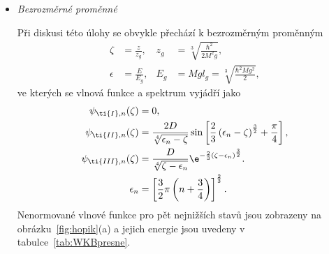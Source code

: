 \begin{solution}
\begin{enumerate}
\begin{itemize}
                    Finální vlnové funkce mají tvar
                    \begin{align}
                        \psi_{\ti{I},n}(z)
                            &=0,\nonumber\\
                        \label{eq:WKB}
                        \psi_{\ti{II},n}(z)
                            &=\frac{2C}{\sqrt[4]{2M\left(E_{n}-mgz\right)}}
                            \sin\left[\frac{2}{3\hbar g}\sqrt{\frac{2}{M}}\left(E_{n}-Mgz\right)^{\frac{3}{2}}+\frac{\pi}{4}\right],\\
                        \psi_{\ti{III},n}(z)
                            &=\frac{C}{\sqrt[4]{2M\left(mgz-E_{n}\right)}}
                            \e^{-\frac{2}{3\hbar g}\sqrt\frac{2}{M}\left(Mgz-E_{n}\right)^{\frac{3}{2}}},\nonumber
                    \end{align}
                    kde za $E_{n}$ se dosadí z kvantovací podmínky~\eqref{eq:podminka0} a parametr $C$ je zafixován normalizací.

                \item\emph{Bezrozměrné proměnné}  
                
                    Při diskusi této úlohy se obvykle přechází k bezrozměrným proměnným
                    \begin{align}
                        \zeta&=\frac{z}{z_{g}},
                        &z_{g}&=\sqrt[3]{\frac{\hbar^{2}}{2M^{2}g}},\nonumber\\
                        \label{eq:Units}
                        \epsilon&=\frac{E}{E_{g}},
                        &E_{g}&=Mgl_{g}=\sqrt[3]{\frac{\hbar^{2}Mg^{2}}{2}},
                    \end{align}
                    ve kterých se vlnová funkce a spektrum vyjádří jako
                    \begin{align}
                        \psi_{\ti{I},n}(\zeta)
                            &=0,\nonumber\\
                        \psi_{\ti{II},n}(\zeta)
                            &=\frac{2D}{\sqrt[4]{\epsilon_{n}-\zeta}}\sin\left[\frac{2}{3}\left(\epsilon_{n}-\zeta\right)^{\frac{3}{2}}+\frac{\pi}{4}\right],\nonumber\\
                        \psi_{\ti{III},n}(\zeta)
                            &=\frac{D}{\sqrt[4]{\zeta-\epsilon_{n}}}\e^{-\frac{2}{3}\left(\zeta-\epsilon_{n}\right)^{\frac{3}{2}}}.\nonumber\\
                        \label{eq:WKBResult}
                        \epsilon_{n}
                            &=\left[\frac{3}{2}\pi\left(n+\frac{3}{4}\right)\right]^{\frac{2}{3}}.
                        \end{align}
                    Nenormované vlnové funkce pro pět nejnižších stavů jsou zobrazeny na obrázku~\ref{fig:hopik}(a) a jejich energie jsou uvedeny v tabulce~\ref{tab:WKBpresne}. 


\end{itemize}
\end{enumerate}
\end{solution}
